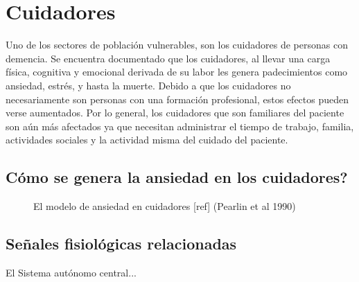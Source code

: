 \section{Cuidadores}\label{secc:caregivers}
Uno de los sectores de poblaci\'on vulnerables, son los cuidadores de personas con demencia. Se encuentra documentado que los cuidadores, al llevar una carga f\'isica, cognitiva y emocional derivada de su labor les genera padecimientos como ansiedad, estr\'es, y hasta la muerte\citep{Chen2013}. Debido a que los cuidadores no necesariamente son personas con una formaci\'on profesional, estos efectos pueden verse aumentados. Por lo general, los cuidadores que son familiares del paciente son a\'un m\'as afectados ya que necesitan administrar el tiempo de trabajo, familia, actividades sociales y la actividad misma del cuidado del paciente.

\subsection{C\'omo se genera la ansiedad en los cuidadores?}\label{secc:caregiverburden}

\begin{figure}[h]
	\centering
	\caption{El modelo de ansiedad en cuidadores [ref] (Pearlin et al 1990)} \label{fig:instauracionFatigaReposo}
\end{figure}

\subsection{Se\~nales fisiol\'ogicas relacionadas}
El Sistema aut\'onomo central...
